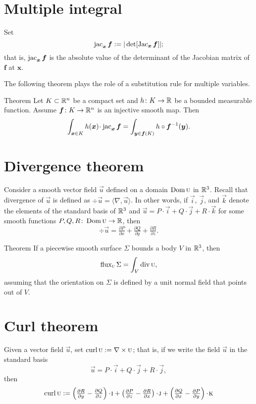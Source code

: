 \section*{Multiple integral}

Set 
\[\mathop{\rm jac}\nolimits_{\bm{x}}\bm{f}:=|\det[\mathop{\rm Jac}\nolimits_{\bm{x}}\bm{f}]|;\]
that is, $\mathop{\rm jac}\nolimits_{\bm{x}}\bm{f}$ is the absolute value of the determinant of the Jacobian matrix of $\bm{f}$ at $\bm{x}$.

The following theorem plays the role of a substitution rule for multiple variables.

\begin{thm}{Theorem}\label{thm:mult-substitution}
Let $K\subset \mathbb{R}^n$ be a compact set and $h\colon K\to\mathbb{R}$ be a bounded measurable function.
Assume $\bm{f}\colon K\to \mathbb{R}^n$ is an injective smooth map.
Then 
\[\int_{\bm{x}\in K} h(\bm{x})\cdot \jac_{\bm{x}}\bm{f}
=
\int_{\bm{y}\in \bm{f}(K)} h\circ \bm{f}^{-1}(\bm{y}).\]

\end{thm}

\section*{Divergence theorem}


Consider a smooth vector field $\vec u$ defined on a domain $\mathop{\rm Dom}\nolimits \textsc u$ in $\mathbb{R}^3$.
Recall that divergence of $\vec u$ is defined as $\div\vec u=\langle \nabla,\vec u\rangle$.
In other words, if $\vec i$, $\vec j$, and $\vec k$ denote the elements of the standard basis of  $\mathbb{R}^3$ and
$\vec u=P\cdot \vec i+Q\cdot\vec j+R\cdot\vec k$
for some smooth functions $P,Q,R\colon\mathop{\rm Dom}\nolimits \textsc u\to \mathbb{R}$,
then
\[\div\vec u=\tfrac{\partial P}{\partial x}+\tfrac{\partial Q}{\partial y}+\tfrac{\partial R}{\partial z}.\]

\begin{thm}{Theorem}\label{thm:div}
If a piecewise smooth surface $\Sigma$ bounds a body $V$ in $\mathbb{R}^3$, then
\[\mathop{\rm flux}\nolimits_{\textsc u}\Sigma=\int_V\mathop{\rm div}\nolimits \textsc u,\]
assuming that the orientation on $\Sigma$ is defined by a unit normal field that points out of $V$.
\end{thm}


\section*{Curl theorem}

Given a vector field $\vec u$, set $\mathop{\rm curl}\nolimits \textsc u:=\nabla\times \textsc u$;
that is, if we write the field $\vec u$ in the standard basis 
\[\vec u=P\cdot \vec i+ Q\cdot\vec j+R\cdot \vec j,\]
then 
\[\curl \vec u\df \left(\tfrac{\partial R}{\partial y}-\tfrac{\partial Q}{\partial z} \right)\cdot \vec i 
+\left(\tfrac{\partial P}{\partial z}-\tfrac{\partial R}{\partial x}\right) \cdot \vec j +\left (\tfrac{\partial Q}{\partial x}-\tfrac{\partial P}{\partial y}\right)\cdot \vec k \]

